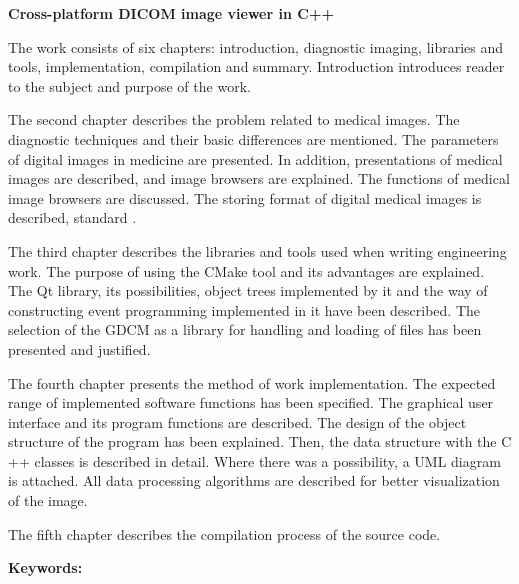 \begin{center}
\large \bf
Cross-platform DICOM image viewer in C++
\end{center}

The work consists of six chapters: introduction, diagnostic imaging, libraries and tools, implementation, compilation and summary.
Introduction introduces reader to the subject and purpose of the work.
\par
The second chapter describes the problem related to medical images.
The diagnostic techniques and their basic differences are mentioned.
The parameters of digital images in medicine are presented.
In addition, presentations of medical images are described, and image browsers are explained.
The functions of medical image browsers are discussed.
The storing format of digital medical images is described, standard \DICOM.
\par
The third chapter describes the libraries and tools used when writing engineering work.
The purpose of using the CMake tool and its advantages are explained.
The Qt library, its possibilities, object trees implemented by it and the way of constructing event programming implemented in it have been described.
The selection of the GDCM as a library for handling and loading of \DICOM files has been presented and justified.
\par
The fourth chapter presents the method of work implementation.
The expected range of implemented software functions has been specified.
The graphical user interface and its program functions are described.
The design of the object structure of the program has been explained.
Then, the data structure with the C ++ classes is described in detail.
Where there was a possibility, a UML diagram is attached.
All data processing algorithms are described for better visualization of the image.
\par
The fifth chapter describes the compilation process of the source code.

\bigskip
{\noindent\bf Keywords:} \keywordsEng

\vfill

